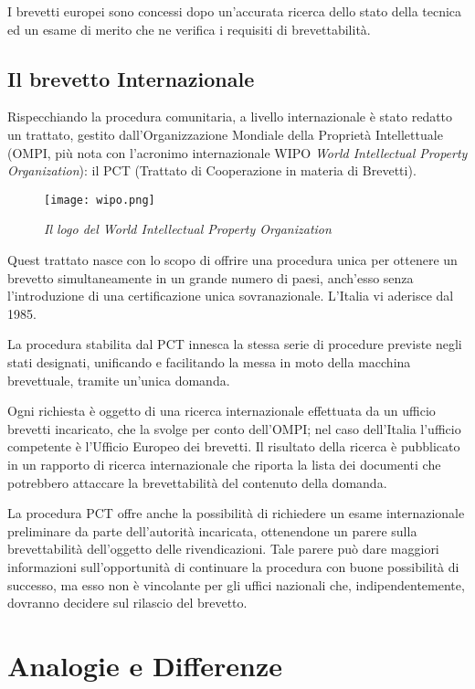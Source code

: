 I brevetti europei sono concessi dopo un'accurata ricerca dello stato della tecnica ed un esame di merito che ne verifica i requisiti di brevettabilità.
\subsection{Il brevetto Internazionale}
Rispecchiando la procedura comunitaria, a livello internazionale è stato redatto un trattato, gestito dall'Organizzazione Mondiale della Proprietà Intellettuale (OMPI, più nota con l'acronimo internazionale WIPO \textit{World Intellectual Property Organization}): il PCT (Trattato di Cooperazione in materia di Brevetti).
\begin{figure}[hb]
\centering
	\texttt{[image: wipo.png]}
\caption{\textit{Il logo del World Intellectual Property Organization}}
\end{figure}
Quest trattato nasce con lo scopo di offrire una procedura unica per ottenere un brevetto simultaneamente in un grande numero di paesi, anch'esso senza l'introduzione di una certificazione unica sovranazionale. L'Italia vi aderisce dal 1985.

La procedura stabilita dal PCT innesca la stessa serie di procedure previste negli stati designati, unificando e facilitando la messa in moto della macchina brevettuale, tramite un'unica domanda.

Ogni richiesta è oggetto di una ricerca internazionale effettuata da un ufficio brevetti incaricato, che la svolge per conto dell'OMPI; nel caso dell'Italia l'ufficio competente è l'Ufficio Europeo dei brevetti. Il risultato della ricerca è pubblicato in un rapporto di ricerca internazionale che riporta la lista dei documenti che potrebbero attaccare la brevettabilità del contenuto della domanda.

La procedura PCT offre anche la possibilità di richiedere un esame internazionale preliminare da parte dell'autorità incaricata, ottenendone un parere sulla brevettabilità dell'oggetto delle rivendicazioni. Tale parere può dare maggiori informazioni sull'opportunità di continuare la procedura con buone possibilità di successo, ma esso non è vincolante per gli uffici nazionali che, indipendentemente, dovranno decidere sul rilascio del brevetto.

\section{Analogie e Differenze}\label{sec:analogDiffBrevetti}

